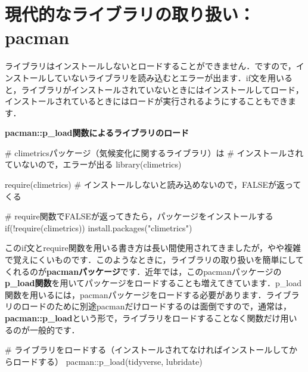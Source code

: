 \documentclass[
  letterpaper,
  DIV=11,
  numbers=noendperiod]{scrreprt}
\newenvironment{Shaded}{\begin{snugshade}}{\end{snugshade}}
\newcommand{\CommentTok}[1]{\textcolor[rgb]{0.37,0.37,0.37}{#1}}
\newcommand{\ControlFlowTok}[1]{\textcolor[rgb]{0.00,0.23,0.31}{#1}}
\newcommand{\FunctionTok}[1]{\textcolor[rgb]{0.28,0.35,0.67}{#1}}
\newcommand{\NormalTok}[1]{\textcolor[rgb]{0.00,0.23,0.31}{#1}}
\newcommand{\SpecialCharTok}[1]{\textcolor[rgb]{0.37,0.37,0.37}{#1}}
\newcommand{\StringTok}[1]{\textcolor[rgb]{0.13,0.47,0.30}{#1}}
\begin{document}
\hypertarget{ux73feux4ee3ux7684ux306aux30e9ux30a4ux30d6ux30e9ux30eaux306eux53d6ux308aux6271ux3044pacman}{%
\section{現代的なライブラリの取り扱い：pacman}\label{ux73feux4ee3ux7684ux306aux30e9ux30a4ux30d6ux30e9ux30eaux306eux53d6ux308aux6271ux3044pacman}}

ライブラリはインストールしないとロードすることができません．ですので，インストールしていないライブラリを読み込むとエラーが出ます．if文を用いると，ライブラリがインストールされていないときにはインストールしてロード，インストールされているときにはロードが実行されるようにすることもできます．

\textbf{pacman::p\_load関数によるライブラリのロード}

\begin{Shaded}
\begin{Highlighting}[]
\CommentTok{\# climetricsパッケージ（気候変化に関するライブラリ）は}
\CommentTok{\# インストールされていないので，エラーが出る}
\FunctionTok{library}\NormalTok{(climetrics) }

\FunctionTok{require}\NormalTok{(climetrics) }\CommentTok{\# インストールしないと読み込めないので，FALSEが返ってくる}

\CommentTok{\# require関数でFALSEが返ってきたら，パッケージをインストールする}
\ControlFlowTok{if}\NormalTok{(}\SpecialCharTok{!}\FunctionTok{require}\NormalTok{(climetrics)) }\FunctionTok{install.packages}\NormalTok{(}\StringTok{"climetrics"}\NormalTok{)}
\end{Highlighting}
\end{Shaded}

このif文とrequire関数を用いる書き方は長い間使用されてきましたが，やや複雑で覚えにくいものです．このようなときに，ライブラリの取り扱いを簡単にしてくれるのが\textbf{pacmanパッケージ}です．近年では，このpacmanパッケージの\textbf{p\_load関数}を用いてパッケージをロードすることも増えてきています．p\_load関数を用いるには，pacmanパッケージをロードする必要があります．ライブラリのロードのために別途pacmanだけロードするのは面倒ですので，通常は，\textbf{pacman::p\_load}という形で，ライブラリをロードすることなく関数だけ用いるのが一般的です．

\begin{Shaded}
\begin{Highlighting}[]
\CommentTok{\# ライブラリをロードする（インストールされてなければインストールしてからロードする）}
\NormalTok{pacman}\SpecialCharTok{::}\FunctionTok{p\_load}\NormalTok{(tidyverse, lubridate)}
\end{Highlighting}
\end{Shaded}
\end{document}
